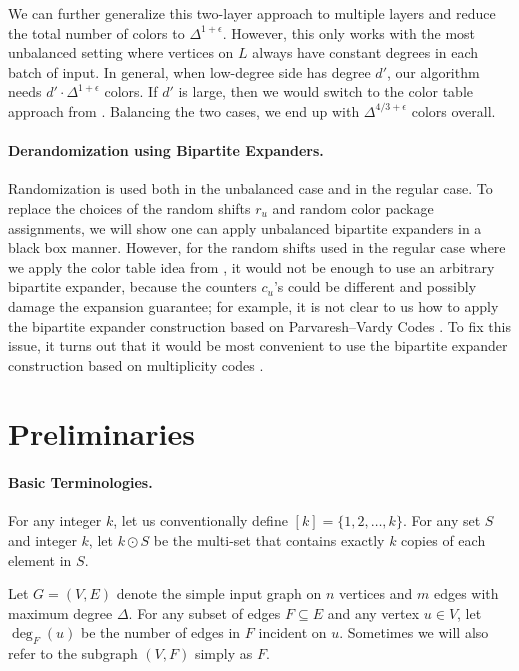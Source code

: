 \documentclass[11pt,a4paper]{article}
\begin{document}
We can further generalize this two-layer approach to multiple layers and reduce the total number of colors to $\Delta^{1 + \epsilon}$. However, this only works with the most unbalanced setting where vertices on $L$ always have constant degrees in each batch of input. In general, when low-degree side has degree $d'$, our algorithm needs $d'\cdot\Delta^{1+\epsilon}$ colors. If $d'$ is large, then we would switch to the color table approach from \cite{behnezhad2023streaming}. Balancing the two cases, we end up with $\Delta^{4/3+\epsilon}$ colors overall. 

\paragraph*{Derandomization using Bipartite Expanders.} Randomization is used both in the unbalanced case and in the regular case. To replace the choices of the random shifts $r_u$ and random color package assignments, we will show one can apply unbalanced bipartite expanders \cite{ta2001loss,guruswami2009unbalanced,kalev2022unbalanced} in a black box manner. However, for the random shifts used in the regular case where we apply the color table idea from \cite{behnezhad2023streaming}, it would not be enough to use an arbitrary bipartite expander, because the counters $c_{u}$'s could be different and possibly damage the expansion guarantee; for example, it is not clear to us how to apply the bipartite expander construction based on Parvaresh–Vardy Codes \cite{guruswami2009unbalanced}. To fix this issue, it turns out that it would be most convenient to use the bipartite expander construction based on multiplicity codes \cite{kalev2022unbalanced}.
 \section{Preliminaries}
\paragraph*{Basic Terminologies.} For any integer $k$, let us conventionally define $[k] = \{1, 2, \ldots, k\}$. For any set $S$ and integer $k$, let $k\odot S$ be the multi-set that contains exactly $k$ copies of each element in $S$.

Let $G = (V, E)$ denote the simple input graph on $n$ vertices and $m$ edges with maximum degree $\Delta$. For any subset of edges $F\subseteq E$ and any vertex $u\in V$, let $\deg_F(u)$ be the number of edges in $F$ incident on $u$. Sometimes we will also refer to the subgraph $(V, F)$ simply as $F$.
\end{document}
